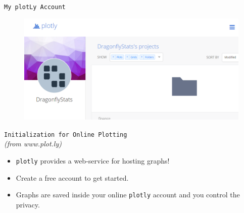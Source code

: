 \documentclass{beamer}
\begin{document}
\begin{frame}
\large
\texttt{My plotLy Account}
\begin{figure}
\centering
\includegraphics[width=01.1\linewidth]{plotlyprofile}
\end{figure}

\end{frame}

\begin{frame}[fragile]
	\Large
\texttt{Initialization for Online Plotting}\\
\textit{(from www.plot.ly)}
\medskip
\begin{itemize}
	\item \texttt{plotly} provides a web-service for hosting graphs! \medskip
	\item Create a free account to get started. 
	\medskip
	\item Graphs are saved inside your online \texttt{plotly} account and you control the privacy. 

\end{itemize}

\end{frame}
\end{document}
